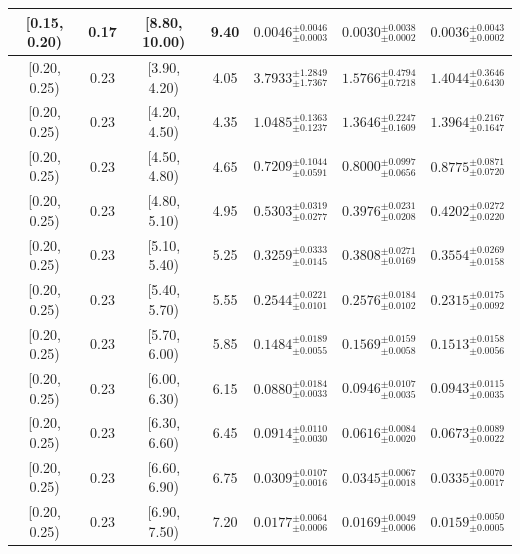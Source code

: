 \begin{longtable}{|c|c|c|c|c|c|c|}
\hline
[0.15, 0.20) & 0.17 & [8.80, 10.00) & 9.40 & $0.0046^{ \pm 0.0046 }_{ \pm 0.0003 }$ & $0.0030^{ \pm 0.0038 }_{ \pm 0.0002 }$ & $0.0036^{ \pm 0.0043 }_{ \pm 0.0002 }$ \\ 
\hline
[0.20, 0.25) & 0.23 & [3.90, 4.20) & 4.05 & $3.7933^{ \pm 1.2849 }_{ \pm 1.7367 }$ & $1.5766^{ \pm 0.4794 }_{ \pm 0.7218 }$ & $1.4044^{ \pm 0.3646 }_{ \pm 0.6430 }$ \\ 
\hline
[0.20, 0.25) & 0.23 & [4.20, 4.50) & 4.35 & $1.0485^{ \pm 0.1363 }_{ \pm 0.1237 }$ & $1.3646^{ \pm 0.2247 }_{ \pm 0.1609 }$ & $1.3964^{ \pm 0.2167 }_{ \pm 0.1647 }$ \\ 
\hline
[0.20, 0.25) & 0.23 & [4.50, 4.80) & 4.65 & $0.7209^{ \pm 0.1044 }_{ \pm 0.0591 }$ & $0.8000^{ \pm 0.0997 }_{ \pm 0.0656 }$ & $0.8775^{ \pm 0.0871 }_{ \pm 0.0720 }$ \\ 
\hline
[0.20, 0.25) & 0.23 & [4.80, 5.10) & 4.95 & $0.5303^{ \pm 0.0319 }_{ \pm 0.0277 }$ & $0.3976^{ \pm 0.0231 }_{ \pm 0.0208 }$ & $0.4202^{ \pm 0.0272 }_{ \pm 0.0220 }$ \\ 
\hline
[0.20, 0.25) & 0.23 & [5.10, 5.40) & 5.25 & $0.3259^{ \pm 0.0333 }_{ \pm 0.0145 }$ & $0.3808^{ \pm 0.0271 }_{ \pm 0.0169 }$ & $0.3554^{ \pm 0.0269 }_{ \pm 0.0158 }$ \\ 
\hline
[0.20, 0.25) & 0.23 & [5.40, 5.70) & 5.55 & $0.2544^{ \pm 0.0221 }_{ \pm 0.0101 }$ & $0.2576^{ \pm 0.0184 }_{ \pm 0.0102 }$ & $0.2315^{ \pm 0.0175 }_{ \pm 0.0092 }$ \\ 
\hline
[0.20, 0.25) & 0.23 & [5.70, 6.00) & 5.85 & $0.1484^{ \pm 0.0189 }_{ \pm 0.0055 }$ & $0.1569^{ \pm 0.0159 }_{ \pm 0.0058 }$ & $0.1513^{ \pm 0.0158 }_{ \pm 0.0056 }$ \\ 
\hline
[0.20, 0.25) & 0.23 & [6.00, 6.30) & 6.15 & $0.0880^{ \pm 0.0184 }_{ \pm 0.0033 }$ & $0.0946^{ \pm 0.0107 }_{ \pm 0.0035 }$ & $0.0943^{ \pm 0.0115 }_{ \pm 0.0035 }$ \\ 
\hline
[0.20, 0.25) & 0.23 & [6.30, 6.60) & 6.45 & $0.0914^{ \pm 0.0110 }_{ \pm 0.0030 }$ & $0.0616^{ \pm 0.0084 }_{ \pm 0.0020 }$ & $0.0673^{ \pm 0.0089 }_{ \pm 0.0022 }$ \\ 
\hline
[0.20, 0.25) & 0.23 & [6.60, 6.90) & 6.75 & $0.0309^{ \pm 0.0107 }_{ \pm 0.0016 }$ & $0.0345^{ \pm 0.0067 }_{ \pm 0.0018 }$ & $0.0335^{ \pm 0.0070 }_{ \pm 0.0017 }$ \\ 
\hline
[0.20, 0.25) & 0.23 & [6.90, 7.50) & 7.20 & $0.0177^{ \pm 0.0064 }_{ \pm 0.0006 }$ & $0.0169^{ \pm 0.0049 }_{ \pm 0.0006 }$ & $0.0159^{ \pm 0.0050 }_{ \pm 0.0005 }$ \\ 
\hline

\end{longtable}
